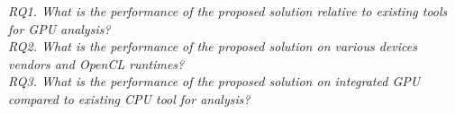 \textit{RQ1. What is the performance of the proposed solution relative to existing tools for GPU analysis?}\\

\textit{RQ2. What is the performance of the proposed solution on various devices vendors and OpenCL runtimes?}\\

\textit{RQ3. What is the performance of the proposed solution on integrated GPU compared to existing CPU tool for analysis?}\\


